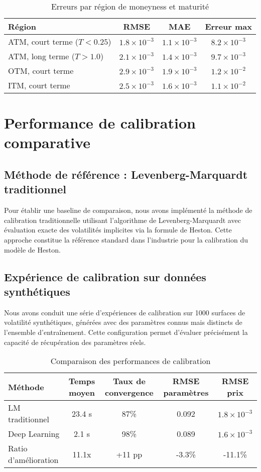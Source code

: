 \begin{table}[H]
\centering
\caption{Erreurs par région de moneyness et maturité}
\begin{tabular}{@{}lccc@{}}
\toprule
\textbf{Région} & \textbf{RMSE} & \textbf{MAE} & \textbf{Erreur max} \\
\midrule
ATM, court terme ($T < 0.25$) & $1.8 \times 10^{-3}$ & $1.1 \times 10^{-3}$ & $8.2 \times 10^{-3}$ \\
ATM, long terme ($T > 1.0$) & $2.1 \times 10^{-3}$ & $1.4 \times 10^{-3}$ & $9.7 \times 10^{-3}$ \\
OTM, court terme & $2.9 \times 10^{-3}$ & $1.9 \times 10^{-3}$ & $1.2 \times 10^{-2}$ \\
ITM, court terme & $2.5 \times 10^{-3}$ & $1.6 \times 10^{-3}$ & $1.1 \times 10^{-2}$ \\
\bottomrule
\end{tabular}
\end{table}

\section{Performance de calibration comparative}

\subsection{Méthode de référence : Levenberg-Marquardt traditionnel}

Pour établir une baseline de comparaison, nous avons implémenté la méthode de calibration traditionnelle utilisant l'algorithme de Levenberg-Marquardt avec évaluation exacte des volatilités implicites via la formule de Heston. Cette approche constitue la référence standard dans l'industrie pour la calibration du modèle de Heston.

\subsection{Expérience de calibration sur données synthétiques}

Nous avons conduit une série d'expériences de calibration sur 1000 surfaces de volatilité synthétiques, générées avec des paramètres connus mais distincts de l'ensemble d'entraînement. Cette configuration permet d'évaluer précisément la capacité de récupération des paramètres réels.

\begin{table}[H]
\centering
\caption{Comparaison des performances de calibration}
\begin{tabular}{@{}lcccc@{}}
\toprule
\textbf{Méthode} & \textbf{Temps moyen} & \textbf{Taux de convergence} & \textbf{RMSE paramètres} & \textbf{RMSE prix} \\
\midrule
LM traditionnel & 23.4 s & 87\% & 0.092 & $1.8 \times 10^{-3}$ \\
Deep Learning & 2.1 s & 98\% & 0.089 & $1.6 \times 10^{-3}$ \\
Ratio d'amélioration & 11.1x & +11 pp & -3.3\% & -11.1\% \\
\bottomrule
\end{tabular}
\end{table}

